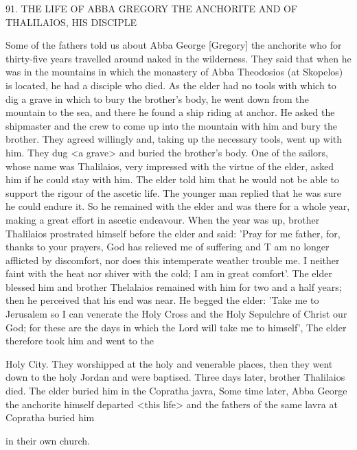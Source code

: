 91. THE LIFE OF ABBA GREGORY THE ANCHORITE
AND OF THALILAIOS, HIS DISCIPLE

Some of the fathers told us about Abba George [Gregory] the
anchorite who for thirty-five years travelled around naked in the
wilderness. They said that when he was in the mountains in which
the monastery of Abba Theodosios (at Skopelos) is located, he had
a disciple who died. As the elder had no tools with which to dig a
grave in which to bury the brother's body, he went down from the
mountain to the sea, and there he found a ship riding at anchor. He
asked the shipmaster and the crew to come up into the mountain
with him and bury the brother. They agreed willingly and, taking up
the necessary tools, went up with him. They dug <a grave> and
buried the brother's body. One of the sailors, whose name was
Thalilaios, very impressed with the virtue of the elder, asked him if
he could stay with him. The elder told him that he would not be
able to support the rigour of the ascetic life. The younger man
replied that he was sure he could endure it. So he remained with the
elder and was there for a whole year, making a great effort in
ascetic endeavour. When the year was up, brother Thalilaios
prostrated himself before the elder and said: 'Pray for me father,
for, thanks to your prayers, God has relieved me of suffering and
T am no longer afflicted by discomfort, nor does this intemperate
weather trouble me. I neither faint with the heat nor shiver with the
cold; I am in great comfort'. The elder blessed him and brother
Thelalaios remained with him for two and a half years; then he
perceived that his end was near. He begged the elder: 'Take me to
Jerusalem so I can venerate the Holy Cross and the Holy Sepulchre
of Christ our God; for these are the days in which the Lord will
take me to himself', The elder therefore took him and went to the

Holy City. They worshipped at the holy and venerable places, then
they went down to the holy Jordan and were baptised. Three days
later, brother Thalilaios died. The elder buried him in the Copratha
javra, Some time later, Abba George the anchorite himself departed
<this life> and the fathers of the same lavra at Copratha buried him

in their own church.

